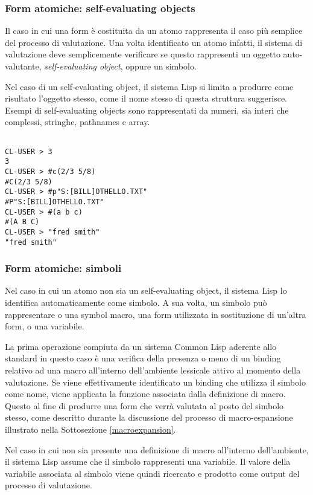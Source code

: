 \subsubsection{Form atomiche: self-evaluating objects}

Il caso in cui una form è costituita da un atomo rappresenta il caso più
semplice del processo di valutazione. Una volta identificato un atomo infatti,
il sistema di valutazione deve semplicemente verificare se questo rappresenti un
oggetto auto-valutante, \textit{self-evaluating object}, oppure un simbolo.

Nel caso di un self-evaluating object, il sistema Lisp si limita a produrre
come risultato l’oggetto stesso, come il nome stesso di questa struttura
suggerisce. Esempi di self-evaluating objects sono rappresentati da numeri,
sia interi che complessi, stringhe, pathnames e array.

\begin{lstlisting}[caption=Esempi di form di tipo self-evaluating object]

CL-USER > 3
3
CL-USER > #c(2/3 5/8)
#C(2/3 5/8)
CL-USER > #p"S:[BILL]OTHELLO.TXT"
#P"S:[BILL]OTHELLO.TXT"
CL-USER > #(a b c)
#(A B C)
CL-USER > "fred smith"
"fred smith"

\end{lstlisting}

\subsubsection{Form atomiche: simboli}

Nel caso in cui un atomo non sia un self-evaluating object, il sistema Lisp lo
identifica automaticamente come simbolo. A sua volta, un simbolo può
rappresentare o una symbol macro, una form utilizzata in sostituzione di
un’altra form, o una variabile.

La prima operazione compiuta da un sistema Common Lisp aderente allo standard in
questo caso è una verifica della presenza o meno di un binding relativo ad una
macro all’interno dell'ambiente lessicale attivo al momento della valutazione.
Se viene effettivamente identificato un binding che utilizza il simbolo come
nome, viene applicata la funzione associata dalla definizione di macro. Questo
al fine di produrre una form che verrà valutata al posto del simbolo stesso,
come descritto durante la discussione del processo di macro-espansione
illustrato nella Sottosezione \ref{macroexpansion}.

Nel caso in cui non sia presente una definizione di macro all’interno
dell’ambiente, il sistema Lisp assume che il simbolo rappresenti una variabile.
Il valore della variabile associata al simbolo viene quindi ricercato e prodotto
come output del processo di valutazione.

